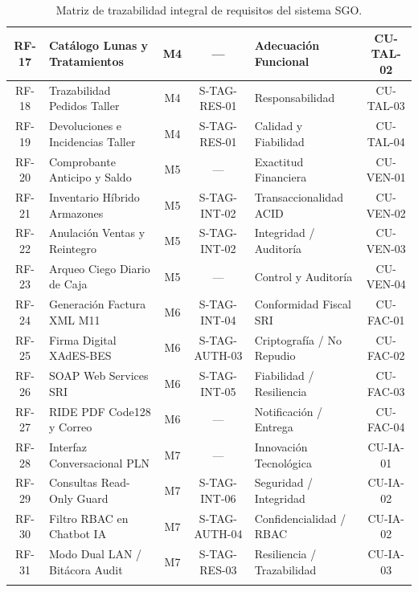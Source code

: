 \documentclass[12pt,a4paper]{report}
\begin{document}
\begin{longtable}{|c|L{4.2cm}|c|c|L{3.2cm}|c|}
\hline
RF-17 & Catálogo Lunas y Tratamientos & M4 & --- & Adecuación Funcional & CU-TAL-02 \\
\hline
RF-18 & Trazabilidad Pedidos Taller & M4 & S-TAG-RES-01 & Responsabilidad & CU-TAL-03 \\
\hline
RF-19 & Devoluciones e Incidencias Taller & M4 & S-TAG-RES-01 & Calidad y Fiabilidad & CU-TAL-04 \\
\hline
RF-20 & Comprobante Anticipo y Saldo & M5 & --- & Exactitud Financiera & CU-VEN-01 \\
\hline
RF-21 & Inventario Híbrido Armazones & M5 & S-TAG-INT-02 & Transaccionalidad ACID & CU-VEN-02 \\
\hline
RF-22 & Anulación Ventas y Reintegro & M5 & S-TAG-INT-02 & Integridad / Auditoría & CU-VEN-03 \\
\hline
RF-23 & Arqueo Ciego Diario de Caja & M5 & --- & Control y Auditoría & CU-VEN-04 \\
\hline
{} RF-24 & Generación Factura XML M11 & M6 & S-TAG-INT-04 & Conformidad Fiscal SRI & CU-FAC-01 \\
\hline
{} RF-25 & Firma Digital XAdES-BES & M6 & S-TAG-AUTH-03 & Criptografía / No Repudio & CU-FAC-02 \\
\hline
{} RF-26 & SOAP Web Services SRI & M6 & S-TAG-INT-05 & Fiabilidad / Resiliencia & CU-FAC-03 \\
\hline
{} RF-27 & RIDE PDF Code128 y Correo & M6 & --- & Notificación / Entrega & CU-FAC-04 \\
\hline
{} RF-28 & Interfaz Conversacional PLN & M7 & --- & Innovación Tecnológica & CU-IA-01 \\
\hline
{} RF-29 & Consultas Read-Only Guard & M7 & S-TAG-INT-06 & Seguridad / Integridad & CU-IA-02 \\
\hline
{} RF-30 & Filtro RBAC en Chatbot IA & M7 & S-TAG-AUTH-04 & Confidencialidad / RBAC & CU-IA-02 \\
\hline
{} RF-31 & Modo Dual LAN / Bitácora Audit& M7 & S-TAG-RES-03 & Resiliencia / Trazabilidad& CU-IA-03 \\
\hline
\caption{Matriz de trazabilidad integral de requisitos del sistema SGO.}
\label{tab:trazabilidad}
\end{longtable}
\end{document}
